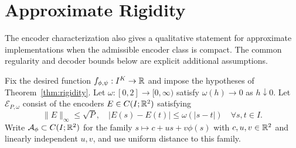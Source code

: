 \section{Approximate Rigidity}
\label{app:approx-rigidity}
The encoder characterization also gives a qualitative statement for approximate implementations when the admissible encoder class is compact. The common regularity and decoder bounds below are explicit additional assumptions.

Fix the desired function $f_{\phi,\psi}:I^K\to\mathbb R$ and impose the hypotheses of Theorem~\ref{thm:rigidity}. Let $\omega:[0,2]\to[0,\infty)$ satisfy $\omega(h)\to0$ as $h\downarrow0$. Let $\mathcal E_{P,\omega}$ consist of the encoders $E\in C(I;\mathbb R^2)$ satisfying
$$
 \|E\|_\infty\le\sqrt P,\quad
 |E(s)-E(t)|\le\omega(|s-t|)\quad\forall s,t\in I.
$$
Write $\mathcal A_\phi\subset C(I;\mathbb R^2)$ for the family $s\mapsto c+us+v\phi(s)$ with $c,u,v\in\mathbb R^2$ and linearly independent $u,v$, and use uniform distance to this family.

